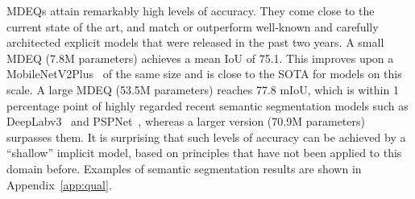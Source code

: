 \documentclass{article}
\begin{document}
\begin{table}[t]
\begin{minipage}{.50\textwidth}
    \label{table:cityscape}
    \centering
    \vspace{2mm}
  \end{minipage}
  \vspace{-.2in}
\end{table}

MDEQs attain remarkably high levels of accuracy. They come close to the current state of the art, and match or outperform well-known and carefully architected explicit models that were released in the past two years. A small MDEQ (7.8M parameters) achieves a mean IoU of 75.1. This improves upon a MobileNetV2Plus~\cite{Sandler2018} of the same size and is close to the SOTA for models on this scale. A large MDEQ (53.5M parameters) reaches 77.8 mIoU, which is within 1 percentage point of highly regarded recent semantic segmentation models such as DeepLabv3~\cite{chen2017rethinking} and PSPNet~\cite{zhao2017pyramid}, whereas a larger version (70.9M parameters) surpasses them. It is surprising that such levels of accuracy can be achieved by a ``shallow'' implicit model, based on principles that have not been applied to this domain before. Examples of semantic segmentation results are shown in Appendix~\ref{app:qual}.
\end{document}
